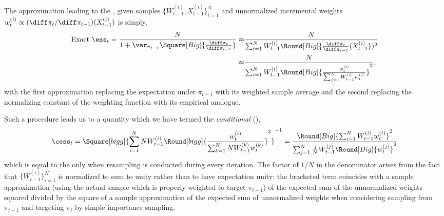 The approximation leading to the \cess, given samples
$\{W_{t-1}^{(i)},X_{t-1}^{(i)}\}_{i=1}^N$ and unnormalized incremental weights
$w_{t}^{(i)} \propto (\diff\pi_t/\diff\pi_{t-1})(X_{t-1}^{(i)})$ is simply,
\begin{align*}
  \text{Exact }\ess_t = \frac{N}{1 + \var_{\pi_{t-1}}
    \Square[Big]{\frac{\diff\pi_t}{\diff\pi_{t-1}}}}
  \approx& \frac{N}{\sum_{i=1}^N W_{t-1}^{(i)}
    \Round[Big]{\frac{\diff\pi_t}{\diff\pi_{t-1}}(X_{t-1}^{(i)}})^2}\\
  \approx& \frac{N}{\sum_{i=1}^N W_{t-1}^{(i)}
    \Round[Big]{\frac{w_t^{(i)}}{\sum_{j=1}^N W_{t-1}^{(j)} w_t^{(j)}}}^2},
\end{align*}
with the first approximation replacing the expectation under $\pi_{t-1}$ with
its weighted sample average and the second replacing the normalizing constant
of the weighting function with its empirical analogue.

Such a procedure leads us to a quantity which we have termed the
\emph{conditional} \ess (\cess),
\begin{equation}
  \cess_t = \Square[bigg]{\sum_{i=1}^N N W_{t-1}^{(i)} \Round[bigg]{
        \frac{w_t^{(i)}}{\sum_{k=1}^N N W_{t-1}^{(k)}w_t^{(k)}}}^2}^{-1}
  = \frac{\Round[Big]{\sum_{i=1}^NW_{t-1}^{(i)}w_t^{(i)}}^2}
  {\sum_{j=1}^N \frac{1}{N} W_{t-1}^{(j)} \Round[Big]{w_t^{(j)}}^2}
\end{equation}
which is equal to the \ess only when resampling is conducted during every
iteration. The factor of $1/N$ in the denominator arises from the fact that
$\{W_{t-1}^{(i)}\}_{i=1}^N$ is normalized to sum to unity rather than to have
expectation unity: the bracketed term coincides with a sample approximation
(using the actual sample which is properly weighted to target $\pi_{t-1}$) of
the expected sum of the unnormalized weights squared divided by the square of
a sample approximation of the expected sum of unnormalized weights when
considering sampling from $\pi_{t-1}$ and targeting $\pi_t$ by simple
importance sampling.



